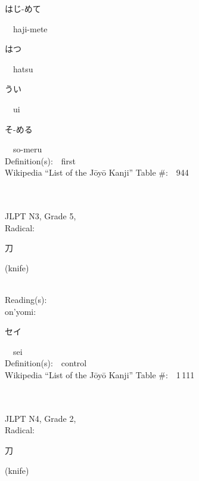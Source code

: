 \begin{multicols}{2}
{\hspace*{2em}}{\begin{CJK}{UTF8}{min} はじ-めて \end{CJK}}\ \ haji-mete\ \ \\
{\hspace*{2em}}{\begin{CJK}{UTF8}{min} はつ \end{CJK}}\ \ hatsu\ \ \\
{\hspace*{2em}}{\begin{CJK}{UTF8}{min} うい \end{CJK}}\ \ ui\ \ \\
{\hspace*{2em}}{\begin{CJK}{UTF8}{min} そ-める \end{CJK}}\ \ so-meru\ \ \\
Definition(s):\ \ first \\
Wikipedia ``List of the J\=oy\=o Kanji'' Table \#:\ \ 944 \\
\ \ \\
{\fontsize{34pt}{40pt}  }\ \ \\  %
{JLPT N3, Grade 5, \\Radical:\ \ {\begin{CJK}{UTF8}{min} 刀 \end{CJK}} (knife) } \\
Reading(s):\ \ \\
{\hspace*{1em}}on'yomi:\ \ \\
{\hspace*{2em}}{\begin{CJK}{UTF8}{min} セイ \end{CJK}}\ \ sei\ \ \\
Definition(s):\ \ control \\
Wikipedia ``List of the J\=oy\=o Kanji'' Table \#:\ \ 1\,111 \\
\ \ \\
{\fontsize{34pt}{40pt}  }\ \ \\  %
{JLPT N4, Grade 2, \\Radical:\ \ {\begin{CJK}{UTF8}{min} 刀 \end{CJK}} (knife) } \\

\end{multicols}

